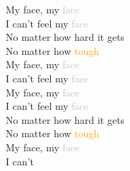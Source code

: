 \documentclass{article}
\begin{document}
My face, my \textcolor{silver}{face} \\
I can't feel my \textcolor{silver}{face} \\
No matter how hard it gets \\
No matter how \textcolor{orange}{tough} \\
My face, my \textcolor{silver}{face} \\
I can't feel my \textcolor{silver}{face} \\
My face, my \textcolor{silver}{face} \\
I can't feel my \textcolor{silver}{face} \\
No matter how hard it gets \\
No matter how \textcolor{orange}{tough} \\
My face, my \textcolor{silver}{face} \\
I can't
\end{document}
